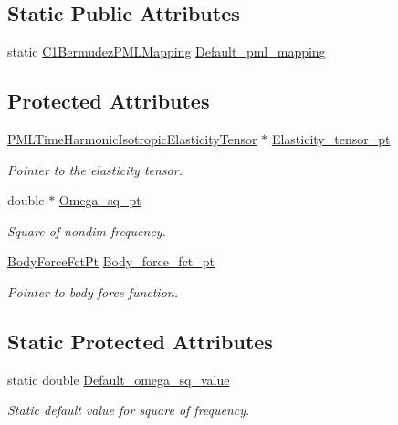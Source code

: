 \subsection*{Static Public Attributes}
\begin{DoxyCompactItemize}
\item 
static \hyperlink{classoomph_1_1C1BermudezPMLMapping}{C1\+Bermudez\+P\+M\+L\+Mapping} \hyperlink{classoomph_1_1PMLTimeHarmonicLinearElasticityEquationsBase_acf158d0a96f8d8477e53a4dd0ea16bd8}{Default\+\_\+pml\+\_\+mapping}
\end{DoxyCompactItemize}
\subsection*{Protected Attributes}
\begin{DoxyCompactItemize}
\item 
\hyperlink{classoomph_1_1PMLTimeHarmonicIsotropicElasticityTensor}{P\+M\+L\+Time\+Harmonic\+Isotropic\+Elasticity\+Tensor} $\ast$ \hyperlink{classoomph_1_1PMLTimeHarmonicLinearElasticityEquationsBase_a53e10e041739091061f1305880391ccd}{Elasticity\+\_\+tensor\+\_\+pt}
\begin{DoxyCompactList}\small\item\em Pointer to the elasticity tensor. \end{DoxyCompactList}\item 
double $\ast$ \hyperlink{classoomph_1_1PMLTimeHarmonicLinearElasticityEquationsBase_a485940b2f07bef035eee53d5b1a5e70f}{Omega\+\_\+sq\+\_\+pt}
\begin{DoxyCompactList}\small\item\em Square of nondim frequency. \end{DoxyCompactList}\item 
\hyperlink{classoomph_1_1PMLTimeHarmonicLinearElasticityEquationsBase_a04218d2a825726c0cd6b975d1ecd2f12}{Body\+Force\+Fct\+Pt} \hyperlink{classoomph_1_1PMLTimeHarmonicLinearElasticityEquationsBase_acc8c7a9df7d314601a8b9c6289f0993b}{Body\+\_\+force\+\_\+fct\+\_\+pt}
\begin{DoxyCompactList}\small\item\em Pointer to body force function. \end{DoxyCompactList}\end{DoxyCompactItemize}
\subsection*{Static Protected Attributes}
\begin{DoxyCompactItemize}
\item 
static double \hyperlink{classoomph_1_1PMLTimeHarmonicLinearElasticityEquationsBase_a48a470c31533302aa223a6ee44e862f3}{Default\+\_\+omega\+\_\+sq\+\_\+value}
\begin{DoxyCompactList}\small\item\em Static default value for square of frequency. \end{DoxyCompactList}\end{DoxyCompactItemize}
